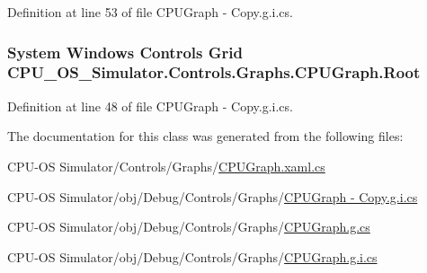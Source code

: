 Definition at line 53 of file C\+P\+U\+Graph -\/ Copy.\+g.\+i.\+cs.

\hypertarget{class_c_p_u___o_s___simulator_1_1_controls_1_1_graphs_1_1_c_p_u_graph_af9993709cdbe673f572a3dc4562293a6}{}
\subsubsection[{Root}]{\setlength{\rightskip}{0pt plus 5cm}System Windows Controls Grid C\+P\+U\+\_\+\+O\+S\+\_\+\+Simulator.\+Controls.\+Graphs.\+C\+P\+U\+Graph.\+Root\hspace{0.3cm}{\ttfamily [package]}}\label{class_c_p_u___o_s___simulator_1_1_controls_1_1_graphs_1_1_c_p_u_graph_af9993709cdbe673f572a3dc4562293a6}


Definition at line 48 of file C\+P\+U\+Graph -\/ Copy.\+g.\+i.\+cs.



The documentation for this class was generated from the following files\+:\begin{DoxyCompactItemize}
\item 
C\+P\+U-\/\+O\+S Simulator/\+Controls/\+Graphs/\hyperlink{_c_p_u_graph_8xaml_8cs}{C\+P\+U\+Graph.\+xaml.\+cs}\item 
C\+P\+U-\/\+O\+S Simulator/obj/\+Debug/\+Controls/\+Graphs/\hyperlink{_c_p_u_graph_01-_01_copy_8g_8i_8cs}{C\+P\+U\+Graph -\/ Copy.\+g.\+i.\+cs}\item 
C\+P\+U-\/\+O\+S Simulator/obj/\+Debug/\+Controls/\+Graphs/\hyperlink{_c_p_u_graph_8g_8cs}{C\+P\+U\+Graph.\+g.\+cs}\item 
C\+P\+U-\/\+O\+S Simulator/obj/\+Debug/\+Controls/\+Graphs/\hyperlink{_c_p_u_graph_8g_8i_8cs}{C\+P\+U\+Graph.\+g.\+i.\+cs}\end{DoxyCompactItemize}
